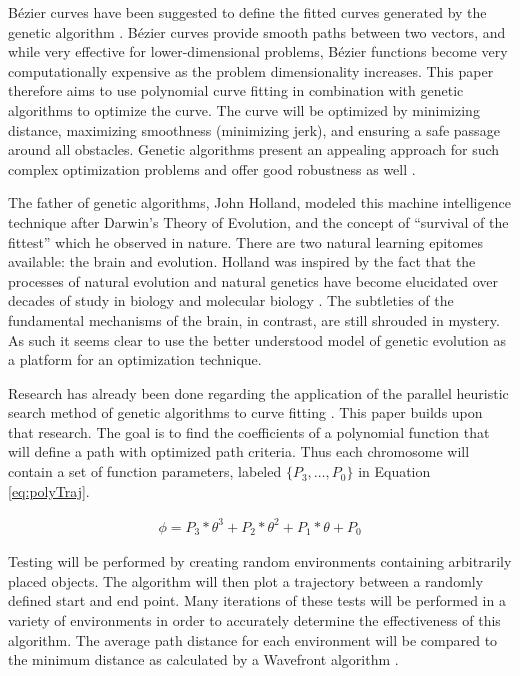 B\'{e}zier curves have been suggested to define the fitted curves generated by the genetic algorithm \cite{choi10}. B\'{e}zier curves provide smooth paths between two vectors, and while very effective for lower-dimensional problems, B\'{e}zier functions become very computationally expensive as the problem dimensionality increases. This paper therefore aims to use polynomial curve fitting in combination with genetic algorithms to optimize the curve. The curve will be optimized by minimizing distance, maximizing smoothness (minimizing jerk), and ensuring a safe passage around all obstacles. Genetic algorithms present an appealing approach for such complex optimization problems and offer good robustness as well \cite{zou12}.

The father of genetic algorithms, John Holland, modeled this machine intelligence technique after Darwin's Theory of Evolution, and the concept of ``survival of the fittest'' which he observed in nature. There are two natural learning epitomes available: the brain and evolution. Holland was inspired by the fact that the processes of natural evolution and natural genetics have become elucidated over decades of study in biology and molecular biology \cite{goldberg88}. The subtleties of the fundamental mechanisms of the brain, in contrast, are still shrouded in mystery. As such it seems clear to use the better understood model of genetic evolution as a platform for an optimization technique.

Research has already been done regarding the application of the parallel heuristic search method of genetic algorithms to curve fitting \cite{gulsen95,karr91,ismail08}. This paper builds upon that research. The goal is to find the coefficients of a polynomial function that will define a path with optimized path criteria. Thus each chromosome will contain a set of function parameters, labeled $\{P_3, \ldots, P_0\}$ in Equation \ref{eq:polyTraj}.

\begin{align} \label{eq:polyTraj}
	\phi = P_3*\theta^3 + P_2*\theta^2 + P_1*\theta + P_0
\end{align}

Testing will be performed by creating random environments containing arbitrarily placed objects. The algorithm will then plot a trajectory between a randomly defined start and end point. Many iterations of these tests will be performed in a variety of environments in order to accurately determine the effectiveness of this algorithm. The average path distance for each environment will be compared to the minimum distance as calculated by a Wavefront algorithm \cite{waslanderI}.

